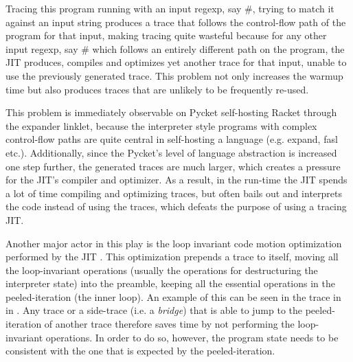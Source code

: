 %

Tracing this program running with an input regexp, say
$\mathtt{\#}$, trying to match it against an
input string produces a trace that follows the control-flow path of
the program for that input, making tracing quite wasteful because for
any other input regexp, say $\mathtt{\#}$ which
follows an entirely different path on the program, the JIT produces,
compiles and optimizes yet another trace for that input, unable to use
the previously generated trace. This problem not only increases the
warmup time but also produces traces that are unlikely to be
frequently re-used.

This problem is immediately observable on Pycket self-hosting Racket
through the expander linklet, because the interpreter style programs
with complex control-flow paths are quite central in self-hosting a
language (e.g. expand, fasl etc.). Additionally, since the Pycket's
level of language abstraction is increased one step further, the
generated traces are much larger, which creates a pressure for the
JIT's compiler and optimizer. As a result, in the run-time the JIT
spends a lot of time compiling and optimizing traces, but often bails
out and interprets the code instead of using the traces, which defeats
the purpose of using a tracing JIT.


Another major actor in this play is the loop invariant code motion
optimization performed by the JIT \cite{loop-aware:12}. This
optimization prepends a trace to itself, moving all the loop-invariant
operations (usually the operations for destructuring the interpreter
state) into the preamble, keeping all the essential operations in the
peeled-iteration (the inner loop). An example of this can be seen in
the trace in  in . Any trace
or a side-trace (i.e. a \emph{bridge}) that is able to jump to the
peeled-iteration of another trace therefore saves time by not
performing the loop-invariant operations. In order to do so, however,
the program state needs to be consistent with the one that is expected
by the peeled-iteration.


